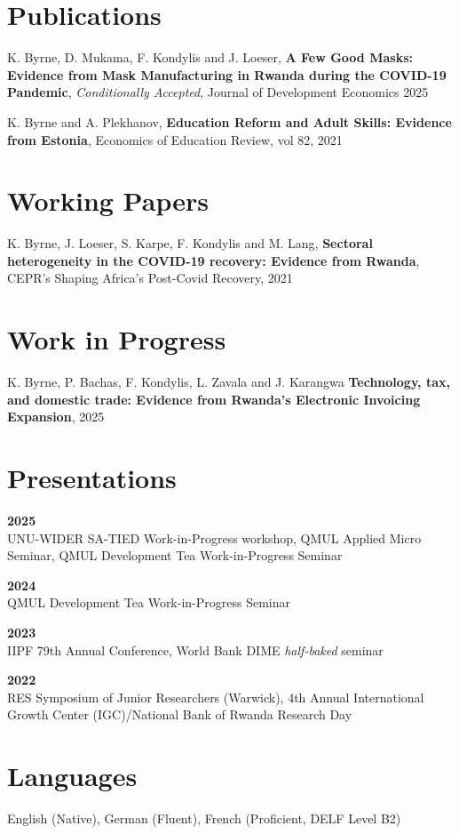 \documentclass[letterpaper,10.9pt, roman]{article}
\begin{document}
\section{Publications} 
{K. Byrne, D. Mukama, F. Kondylis and J. Loeser, \textbf{A Few Good Masks: Evidence from Mask Manufacturing in Rwanda during the COVID-19 Pandemic}, \textit{Conditionally Accepted}, Journal of Development Economics 2025 }\\ \medskip

{K. Byrne and A. Plekhanov, 
	\textbf{Education Reform and Adult Skills: Evidence from Estonia}, Economics of Education Review, vol 82, 2021} \\

\section{Working Papers}
{K. Byrne, J. Loeser, S. Karpe, F. Kondylis and M. Lang, \textbf{Sectoral heterogeneity in the COVID-19 recovery: Evidence from Rwanda}, CEPR's Shaping Africa's Post-Covid Recovery, 2021  }\\ \medskip

\section{Work in Progress}
{K. Byrne, P. Bachas, F. Kondylis, L. Zavala and J. Karangwa \textbf{Technology, tax, and domestic trade: Evidence from Rwanda’s Electronic Invoicing Expansion}, 2025  }\\ \medskip

\section{Presentations}
\textbf{2025}\\
UNU-WIDER SA-TIED Work-in-Progress workshop,  QMUL Applied Micro Seminar, QMUL Development Tea Work-in-Progress Seminar

\textbf{2024}\\
QMUL Development Tea Work-in-Progress Seminar

\textbf{2023}\\
IIPF 79th Annual Conference, World Bank DIME \textit{half-baked} seminar

\textbf{2022}\\
RES Symposium of Junior Researchers (Warwick), 4th Annual International Growth Center (IGC)/National Bank of Rwanda Research Day



\section{Languages}

English (Native), German (Fluent), French (Proficient, DELF Level B2)
 
\end{document}
